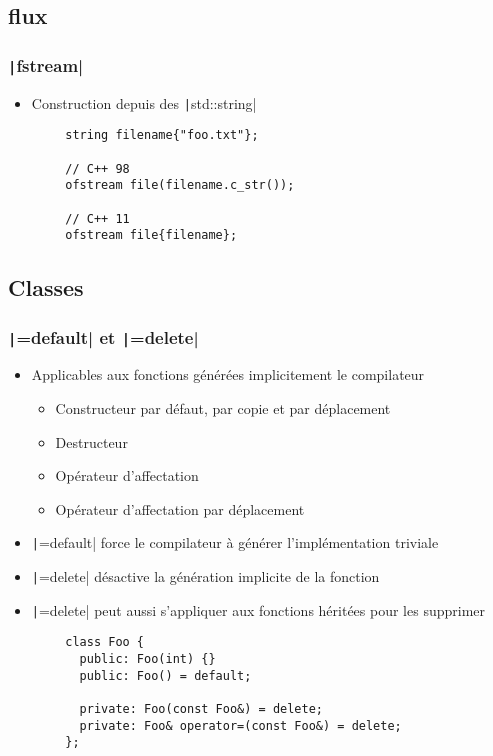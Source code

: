 \documentclass[C++.tex]{subfiles}
\begin{document}
\subsection*{flux}
\begin{frame}[fragile]
	\frametitle{\texttt|fstream|}
	\begin{itemize}
		\item Construction depuis des \texttt|std::string|
	\end{itemize}

	\begin{verbatim}
		string filename{"foo.txt"};

		// C++ 98
		ofstream file(filename.c_str());

		// C++ 11
		ofstream file{filename};
	\end{verbatim}
\end{frame}

\subsection*{Classes}
\begin{frame}[fragile]
	\frametitle{\texttt|=default| et \texttt|=delete|}
	\begin{itemize}
		\item Applicables aux fonctions générées implicitement le compilateur
		\begin{itemize}
			\item Constructeur par défaut, par copie et par déplacement
			\item Destructeur
			\item Opérateur d'affectation
			\item Opérateur d'affectation par déplacement
		\end{itemize}
		\item \texttt|=default| force le compilateur à générer l'implémentation triviale
		\item \texttt|=delete| désactive la génération implicite de la fonction
		\item \texttt|=delete| peut aussi s'appliquer aux fonctions héritées pour les supprimer
	\end{itemize}

	\begin{verbatim}
		class Foo {
		  public: Foo(int) {}
		  public: Foo() = default;

		  private: Foo(const Foo&) = delete;
		  private: Foo& operator=(const Foo&) = delete;
		};
	\end{verbatim}

\end{frame}
\end{document}
